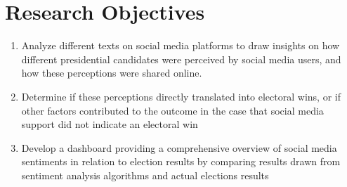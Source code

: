 \section{Research Objectives}
\begin{enumerate}
    \item Analyze different texts on social media platforms to draw insights on how different presidential candidates were perceived by social media users, and how these perceptions were shared online.
    \item Determine if these perceptions directly translated into electoral wins, or if other factors contributed to the outcome in the case that social media support did not indicate an electoral win
    \item Develop a dashboard providing a comprehensive overview of social media sentiments in relation to election results by comparing results drawn from sentiment analysis algorithms and actual elections results
\end{enumerate}